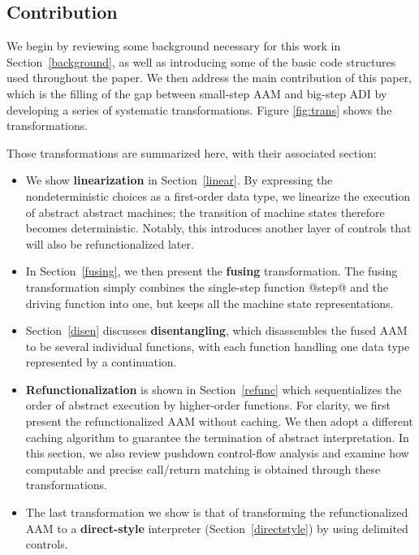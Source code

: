 \documentclass[acmsmall,review,anonymous]{acmart}\settopmatter{printfolios=true,printccs=false,printacmref=false}
\begin{document}
\subsection{Contribution}

We begin by reviewing some background
necessary for this work in Section~\ref{background}, as well as introducing some of the basic
code structures used throughout the paper. We then address the main contribution of this
paper, which is the filling of the gap between small-step AAM and big-step ADI by developing a
series of systematic transformations. Figure \ref{fig:trans} shows the transformations.

Those transformations are summarized here, with their associated section:

\begin{itemize}
\item We show \textbf{linearization} in Section~\ref{linear}. By expressing the
  nondeterministic choices as a first-order data type, we linearize the execution
  of abstract abstract machines; the transition of machine states therefore becomes deterministic. Notably, this introduces another layer of controls that will also be refunctionalized later.

\item In Section~\ref{fusing}, we then present the \textbf{fusing} transformation.
  The fusing transformation simply combines the single-step function @step@ and the driving
  function into one, but keeps all the machine state representations.

\item Section~\ref{disen} discusses \textbf{disentangling}, which disassembles the fused AAM to be several individual functions, with each function handling one data type represented by a continuation.

\item \textbf{Refunctionalization} is shown in Section~\ref{refunc} which sequentializes
  the order of abstract execution by higher-order functions.
  For clarity, we first present the refunctionalized AAM without caching. We then adopt a different caching algorithm to guarantee the termination of abstract interpretation.
  In this section, we also review pushdown control-flow analysis and examine how computable
    and precise call/return matching is obtained through these transformations.

\item The last transformation we show is that of transforming the refunctionalized AAM
  to a \textbf{direct-style} interpreter (Section~\ref{directstyle}) by using delimited controls.

\end{itemize}
\end{document}
